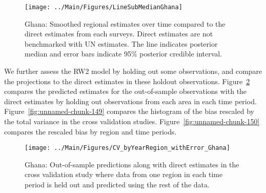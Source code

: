 \documentclass[12pt]{article}\usepackage[]{graphicx}\usepackage[]{color}
\newenvironment{knitrout}{}{} %
\begin{document}
\begin{knitrout}
\color{fgcolor}\begin{figure}[bht]

{\centering \texttt{[image: ../Main/Figures/LineSubMedianGhana]} 

}

\caption[Ghana]{Ghana: Smoothed regional estimates over time compared to the direct estimates from each surveys. Direct estimates are not benchmarked with UN estimates. The line indicates posterior median and error bars indicate 95\% posterior credible interval.}\label{fig:unnamed-chunk-147}
\end{figure}


\end{knitrout}
We further assess the RW2 model by holding out some observations, and compare the projections to the direct estimates in these holdout observations. Figure~\ref{fig:unnamed-chunk-148} compares the predicted estimates for the out-of-sample observations  with the direct estimates by holding out observations from each area in each time period.  Figure~\ref{fig:unnamed-chunk-149} compares the histogram of the bias rescaled by the total variance in the cross validation studies. Figure~\ref{fig:unnamed-chunk-150} compares the rescaled bias by region and time periods.



 
\begin{knitrout}
\color{fgcolor}\begin{figure}[bht]

{\centering \texttt{[image: ../Main/Figures/CV\_byYearRegion\_withError\_Ghana]} 

}

\caption[Ghana]{Ghana: Out-of-sample predictions along with direct estimates in the cross validation study where data from one region in each time period is held out and predicted using the rest of the data.}\label{fig:unnamed-chunk-148}
\end{figure}


\end{knitrout}
\end{document}
